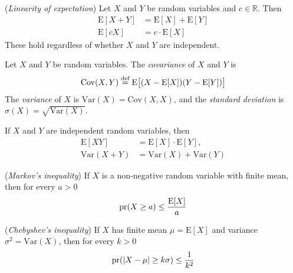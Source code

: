 \documentclass[a4paper, 12pt]{book} %
\begin{document}
\begin{proposition}
    (\emph{Linearity of expectation}) Let $X$ and $Y$ be random variables and $c \in \mathbb{R}$. Then
    \begin{align}
        \mathrm{E}[X + Y] &= \mathrm{E}[X] + \mathrm{E}[Y] \\
        \mathrm{E}[cX] &= c \cdot \mathrm{E}[X]
    \end{align}
    These hold regardless of whether $X$ and $Y$ are independent.
\end{proposition}

\begin{definition}
    Let $X$ and $Y$ be random variables. The \emph{covariance} of $X$ and $Y$ is
    \begin{align}
        \mathrm{Cov}(X, Y) \overset{\text{def}}{=} \mathrm{E}\big[ (X - \mathrm{E}[X])(Y - \mathrm{E}[Y]) \big]
    \end{align}
    The \emph{variance} of $X$ is $\mathrm{Var}(X) = \mathrm{Cov}(X, X)$, and the \emph{standard deviation} is $\sigma(X) = \sqrt{\mathrm{Var}(X)}$.
\end{definition}

\begin{proposition}
    If $X$ and $Y$ are independent random variables, then
    \begin{align}
        \mathrm{E}[XY] &= \mathrm{E}[X] \cdot \mathrm{E}[Y], \\
        \mathrm{Var}(X + Y) &= \mathrm{Var}(X) + \mathrm{Var}(Y)
    \end{align}
\end{proposition}

\begin{theorem}
    (\emph{Markov's inequality}) If $X$ is a non-negative random variable with finite mean, then for every $a > 0$
    \begin{align}
        \operatorname{pr}(X \geq a) \leq \frac{\mathrm{E}[X]}{a}
    \end{align}
\end{theorem}

\begin{theorem}
    (\emph{Chebyshev's inequality}) If $X$ has finite mean $\mu = \mathrm{E}[X]$ and variance $\sigma^2 = \mathrm{Var}(X)$, then for every $k > 0$
    \begin{align}
        \operatorname{pr}(|X - \mu| \geq k\sigma) \leq \frac{1}{k^2}
    \end{align}
\end{theorem}
\end{document}
